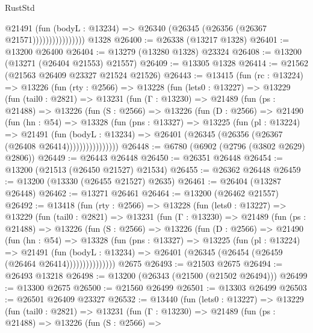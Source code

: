 \begin{lexlean}{RustStd}
\begin{coremodule}
                          @21491
                            (fun (bodyL : @13234) =>
                            @26340 (@26345 (@26356 (@26367 @21571))))))))))))))))
    @1328
@26400 := @26338 (@13217 @1328)
@26401 := @13200 @26400
@26404 := @13279 (@13280 @1328) @23324
@26408 := @13200 (@13271 (@26404 @21553) @21557)
@26409 := @13305 @1328
@26414 := @21562 (@21563 @26409 @23327 @21524 @21526)
@26443 := @13415
    (fun (rc : @13224) =>
    @13226
      (fun (rty : @2566) =>
      @13228
        (fun (lets0 : @13227) =>
        @13229
          (fun (tail0 : @2821) =>
          @13231
            (fun (Γ : @13230) =>
            @21489
              (fun (ps : @21488) =>
              @13226
                (fun (S : @2566) =>
                @13226
                  (fun (D : @2566) =>
                  @21490
                    (fun (hn : @54) =>
                    @13328
                      (fun (pns : @13327) =>
                      @13225
                        (fun (pl : @13224) =>
                        @21491
                          (fun (bodyL : @13234) =>
                          @26401 (@26345 (@26356 (@26367 (@26408 @26414))))))))))))))))
@26448 := @6780 (@6902 (@2796 (@3802 @2629) @2806))
@26449 := @26443 @26448
@26450 := @26351 @26448
@26454 := @13200 (@21513 (@26450 @21527) @21534)
@26455 := @26362 @26448
@26459 := @13200 (@13330 (@26455 @21527) @2635)
@26461 := @26404 (@13287 @26448)
@26462 := @13271 @26461
@26464 := @13200 (@26462 @21557)
@26492 := @13418
    (fun (rty : @2566) =>
    @13228
      (fun (lets0 : @13227) =>
      @13229
        (fun (tail0 : @2821) =>
        @13231
          (fun (Γ : @13230) =>
          @21489
            (fun (ps : @21488) =>
            @13226
              (fun (S : @2566) =>
              @13226
                (fun (D : @2566) =>
                @21490
                  (fun (hn : @54) =>
                  @13328
                    (fun (pns : @13327) =>
                    @13225
                      (fun (pl : @13224) =>
                      @21491
                        (fun (bodyL : @13234) =>
                        @26401 (@26345 (@26454 (@26459 (@26464 @26414)))))))))))))))
    @2675
@26493 := @21503 @2675
@26494 := @26493 @13218
@26498 := @13200 (@26343 (@21500 (@21502 @26494)))
@26499 := @13300 @2675
@26500 := @21560 @26499
@26501 := @13303 @26499
@26503 := @26501 @26409 @23327
@26532 := @13440
    (fun (lets0 : @13227) =>
    @13229
      (fun (tail0 : @2821) =>
      @13231
        (fun (Γ : @13230) =>
        @21489
          (fun (ps : @21488) =>
          @13226
            (fun (S : @2566) =>

\end{coremodule}
\end{lexlean}
